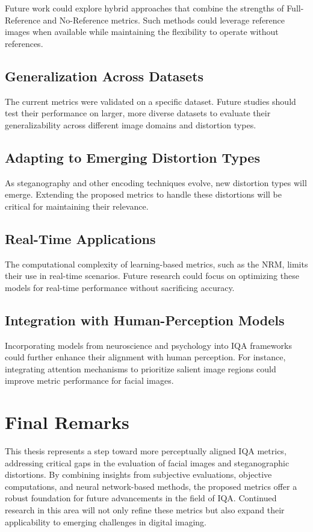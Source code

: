 Future work could explore hybrid approaches that combine the strengths of Full-Reference and No-Reference metrics. Such methods could leverage reference images when available while maintaining the flexibility to operate without references.

\subsection{Generalization Across Datasets}

The current metrics were validated on a specific dataset. Future studies should test their performance on larger, more diverse datasets to evaluate their generalizability across different image domains and distortion types.

\subsection{Adapting to Emerging Distortion Types}

As steganography and other encoding techniques evolve, new distortion types will emerge. Extending the proposed metrics to handle these distortions will be critical for maintaining their relevance.

\subsection{Real-Time Applications}

The computational complexity of learning-based metrics, such as the NRM, limits their use in real-time scenarios. Future research could focus on optimizing these models for real-time performance without sacrificing accuracy.

\subsection{Integration with Human-Perception Models}

Incorporating models from neuroscience and psychology into IQA frameworks could further enhance their alignment with human perception. For instance, integrating attention mechanisms to prioritize salient image regions could improve metric performance for facial images.

\section{Final Remarks}

This thesis represents a step toward more perceptually aligned IQA metrics, addressing critical gaps in the evaluation of facial images and steganographic distortions. By combining insights from subjective evaluations, objective computations, and neural network-based methods, the proposed metrics offer a robust foundation for future advancements in the field of IQA. Continued research in this area will not only refine these metrics but also expand their applicability to emerging challenges in digital imaging.
